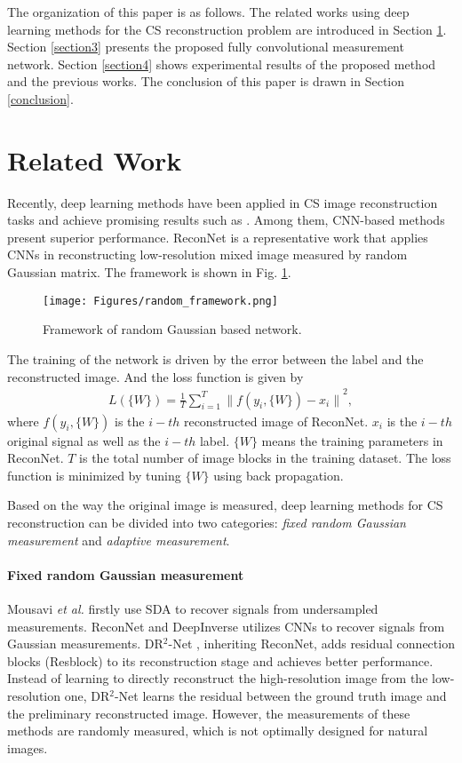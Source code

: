 \documentclass[review]{elsarticle}
\begin{document}
The organization of this paper is as follows. The related works using deep learning methods for the CS reconstruction problem are introduced in Section \ref{RelatedWork}. Section \ref{section3} presents the proposed fully convolutional measurement network. Section \ref{section4} shows experimental results of the proposed method and the previous works. The conclusion of this paper is drawn in Section \ref{conclusion}.

\section{Related Work}\label{RelatedWork}
Recently, deep learning methods have been applied in CS image reconstruction tasks and achieve promising results such as \cite{mousavi2015deep,kulkarni2016reconnet,mousavi2017deepcodec}. Among them, CNN-based methods present superior performance. ReconNet \cite{kulkarni2016reconnet} is a representative work that applies CNNs in reconstructing low-resolution mixed image measured by random Gaussian matrix. The framework is shown in Fig. \ref{fig:random_framework}.
\begin{figure}[h!]
	\centering
	\texttt{[image: Figures/random\_framework.png]}
	\caption{Framework of random Gaussian based network.}
	\label{fig:random_framework}
\end{figure}

The training of the network is driven by the error between the label and the reconstructed image. And the loss function is given by
\begin{eqnarray}\label{equation1}
L(\{W\})=\frac{1}{T}\sum_{i=1}^{T}{\lVert f(y_i,\{W\})-x_i \rVert}^2,
\end{eqnarray}
where $f(y_i,\{W\})$ is the $i-th$ reconstructed image of ReconNet. $x_i$ is the $i-th$ original signal as well as the $i-th$ label. $\{W\}$ means the training parameters in ReconNet. $T$ is the total number of image blocks in the training dataset. The loss function is minimized by tuning $\{W\}$ using back propagation.

Based on the way the original image is measured, deep learning methods for CS reconstruction can be divided into two categories: \emph{fixed random Gaussian measurement} and \emph{adaptive measurement}.
\paragraph{Fixed random Gaussian measurement}
Mousavi \emph{et al.} \cite{mousavi2015deep} firstly use SDA to recover signals from undersampled measurements. ReconNet \cite{kulkarni2016reconnet} and DeepInverse \cite{mousavi2017learning} utilizes CNNs to recover signals from Gaussian measurements. DR$^2$-Net \cite{yao2017dr}, inheriting ReconNet, adds residual connection blocks (Resblock) to its reconstruction stage and achieves better performance. Instead of learning to directly reconstruct the high-resolution image from the low-resolution one, DR$^2$-Net learns the residual between the ground truth image and the preliminary reconstructed image. However, the measurements of these methods are randomly measured, which is not optimally designed for natural images.
\end{document}
